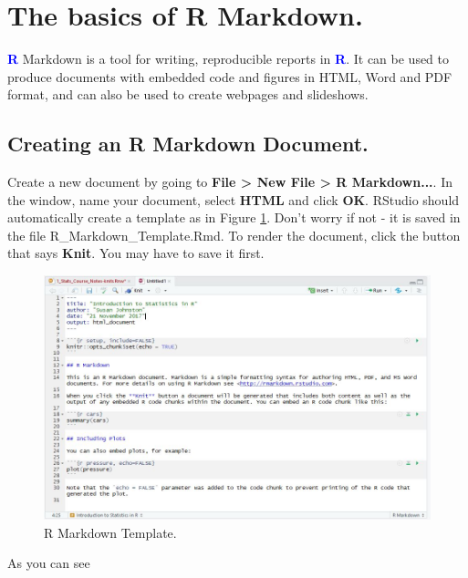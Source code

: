 \documentclass[a4paper,12pt]{article}
\newcommand\boldblue[1]{\textcolor{blue}{\textbf{#1}}}
\begin{document}
\section {The basics of R Markdown.}

\boldblue{R} Markdown is a tool for writing, reproducible reports in \boldblue{R}. It can be used to produce documents with embedded code and figures in HTML, Word and PDF format, and can also be used to create webpages and slideshows.

\subsection{Creating an R Markdown Document.}

Create a new document by going to \textbf{File > New File > R Markdown...}. In the window, name your document, select \textbf{HTML} and click \textbf{OK}. RStudio should automatically create a template as in Figure \ref{fig:MarkdownTemplate}. Don't worry if not - it is saved in the file R\_Markdown\_Template.Rmd. To render the document, click the button that says \textbf{Knit}. You may have to save it first.

\begin{figure}[h]
	\centering 
	\includegraphics[width=1\textwidth]{figs/MarkdownTemplate.JPG}
	\caption{R Markdown Template.}
	\label{fig:MarkdownTemplate}
\end{figure} 

As you can see
\end{document}

